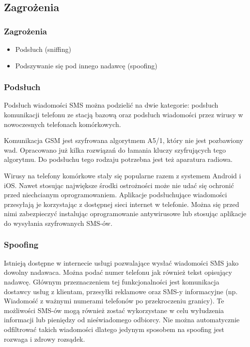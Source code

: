 \documentclass[xcolor=table]{beamer}
\begin{document}
\subsection{Zagrożenia}
\begin{frame}
  \frametitle{Zagrożenia}

\begin{itemize}
  \item Podsłuch (sniffing) 
  \item Podszywanie się pod innego nadawcę (spoofing)
\end{itemize}

\end{frame}

\begin{frame}[allowframebreaks]
  \frametitle{Podsłuch}

  Podsłuch wiadomości SMS można podzielić na dwie kategorie: podsłuch
  komunikacji telefonu ze stacją bazową oraz podsłuch wiadomości przez wirusy w
  nowoczesnych telefonach komórkowych.

  Komunikacja GSM jest szyfrowana algorytmem A5/1, który nie jest pozbawiony
  wad. Opracowano już kilka rozwiązań do łamania kluczy szyfrujących tego
  algorytmu. Do podsłuchu tego rodzaju potrzebna jest też aparatura radiowa.

  \framebreak

  Wirusy na telefony komórkowe stały się popularne razem z systemem Android i
  iOS. Nawet stosując największe środki ostrożności może nie udać się ochronić
  przed niechcianym oprogramowaniem. Aplikacje podsłuchujące wiadomości
  przesyłają je korzystając z dostępnej sieci internet w telefonie. 
  Można się przed nimi zabezpieczyć instalując oprogramowanie
  antywirusowe lub stosując aplikacje do wysyłania szyfrowanych SMS-ów.
\end{frame}

\begin{frame}
  \frametitle{Spoofing}
  
  Istnieją dostępne w internecie usługi pozwalające wysłać wiadomości SMS jako
  dowolny nadawaca. Można podać numer telefonu jak również tekst opisujący
  nadawcę. Głównym przeznaczeniem tej funkcjonalności jest komunikacja dostawcy
  usług z klientam, przesyłki reklamowe oraz SMS-y informacyjne (np. Wiadomość
  z ważnymi numerami telefonów po przekroczeniu granicy). Te możliwości SMS-ów
  mogą również zostać wykorzystane w celu wyłudzenia informacji lub pieniędzy
  od nieświadomego odbiorcy. Nie można automatycznie odfiltrować takich
  wiadomości dlatego jedynym sposobem na spoofing jest rozwaga i zdrowy
  rozsądek.

\end{frame}
\end{document}
